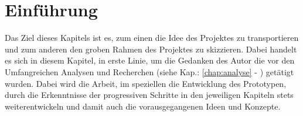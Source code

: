 \documentclass[Bachelorarbeit.tex]{subfiles}
\begin{document}
\chapter{Einführung}
\label{chap:einfuehrung}

Das Ziel dieses Kapitels ist es, zum einen die Idee des Projektes zu transportieren und zum anderen den groben Rahmen des Projektes zu skizzieren.
Dabei handelt es sich in diesem Kapitel, in erste Linie, um die Gedanken des Autor die vor den Umfangreichen Analysen und Recherchen (siehe Kap.: \ref{chap:analyse} - ) getätigt wurden.
Dabei wird die Arbeit, im speziellen die Entwicklung des Prototypen, durch die Erkenntnisse der progressiven Schritte in den jeweiligen Kapiteln stets weiterentwickeln und damit auch die vorausgegangenen Ideen und Konzepte.

\end{document}
